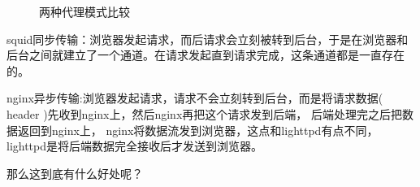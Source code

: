 \begin{figure}[!h]
  \centering
  \hspace{30pt}
  \caption{两种代理模式比较}
  \label{fig:squidVSnginx}
\end{figure}

squid同步传输：浏览器发起请求，而后请求会立刻被转到后台，于是在浏览器和
后台之间就建立了一个通道。在请求发起直到请求完成，这条通道都是一直存在
的。

nginx异步传输:浏览器发起请求，请求不会立刻转到后台，而是将请求数据(
header )先收到nginx上，然后nginx再把这个请求发到后端， 后端处理完之后把数
据返回到nginx上， nginx将数据流发到浏览器，这点和lighttpd有点不同，
lighttpd是将后端数据完全接收后才发送到浏览器。

那么这到底有什么好处呢？

